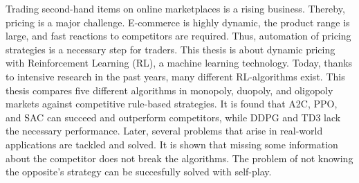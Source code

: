 Trading second-hand items on online marketplaces is a rising business.
Thereby, pricing is a major challenge.
E-commerce is highly dynamic, the product range is large, and fast reactions to competitors are required.
Thus, automation of pricing strategies is a necessary step for traders.
This thesis is about dynamic pricing with Reinforcement Learning (RL), a machine learning technology.
Today, thanks to intensive research in the past years, many different RL-algorithms exist.
This thesis compares five different algorithms in monopoly, duopoly, and oligopoly markets against competitive rule-based strategies.
It is found that A2C, PPO, and SAC can succeed and outperform competitors, while DDPG and TD3 lack the necessary performance.
Later, several problems that arise in real-world applications are tackled and solved.
It is shown that missing some information about the competitor does not break the algorithms.
The problem of not knowing the opposite's strategy can be succesfully solved with self-play.

